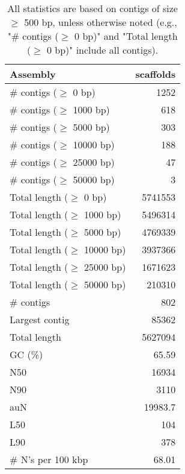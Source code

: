 \documentclass[12pt,a4paper]{article}
\begin{document}
\begin{table}[ht]
\begin{center}
\caption{All statistics are based on contigs of size $\geq$ 500 bp, unless otherwise noted (e.g., "\# contigs ($\geq$ 0 bp)" and "Total length ($\geq$ 0 bp)" include all contigs).}
\begin{tabular}{|l*{1}{|r}|}
\hline
Assembly & scaffolds \\ \hline
\# contigs ($\geq$ 0 bp) & 1252 \\ \hline
\# contigs ($\geq$ 1000 bp) & 618 \\ \hline
\# contigs ($\geq$ 5000 bp) & 303 \\ \hline
\# contigs ($\geq$ 10000 bp) & 188 \\ \hline
\# contigs ($\geq$ 25000 bp) & 47 \\ \hline
\# contigs ($\geq$ 50000 bp) & 3 \\ \hline
Total length ($\geq$ 0 bp) & 5741553 \\ \hline
Total length ($\geq$ 1000 bp) & 5496314 \\ \hline
Total length ($\geq$ 5000 bp) & 4769339 \\ \hline
Total length ($\geq$ 10000 bp) & 3937366 \\ \hline
Total length ($\geq$ 25000 bp) & 1671623 \\ \hline
Total length ($\geq$ 50000 bp) & 210310 \\ \hline
\# contigs & 802 \\ \hline
Largest contig & 85362 \\ \hline
Total length & 5627094 \\ \hline
GC (\%) & 65.59 \\ \hline
N50 & 16934 \\ \hline
N90 & 3110 \\ \hline
auN & 19983.7 \\ \hline
L50 & 104 \\ \hline
L90 & 378 \\ \hline
\# N's per 100 kbp & 68.01 \\ \hline
\end{tabular}
\end{center}
\end{table}
\end{document}
